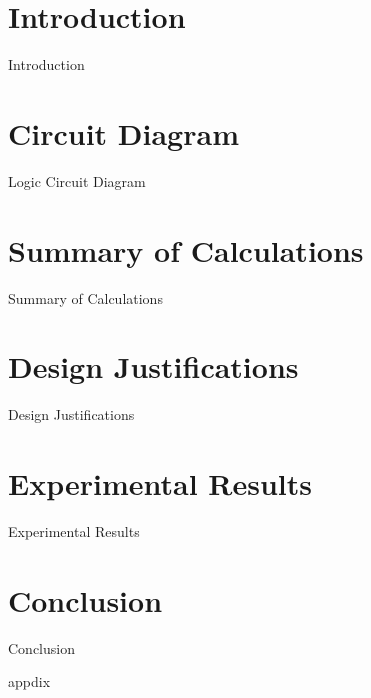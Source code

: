 \documentclass[12pt, a4paper]{report}
\makeatletter
\let\plainappendixpage\appendixpage
\renewcommand{\appendixpage}{%
  \begingroup
  \let\ps@plain\ps@empty
  \plainappendixpage
  \endgroup}
\makeatother
\begin{document}
\maketitle

\tableofcontents
\clearpage






\chapter{{Introduction}}
        
        {Introduction}  
        
        

\chapter{{Circuit Diagram}}

		{Logic Circuit Diagram}

\chapter{{Summary of Calculations}}

		{Summary of Calculations}

\chapter{{Design Justifications}}

		{Design Justifications}
        
        
      
\chapter{{Experimental Results}}

		{Experimental Results}      
        
\chapter{{Conclusion}}
        
        {Conclusion}
        

        
\clearpage



\clearpage

\appendix

\appendixpage

\clearpage

{appdix}
\end{document}
